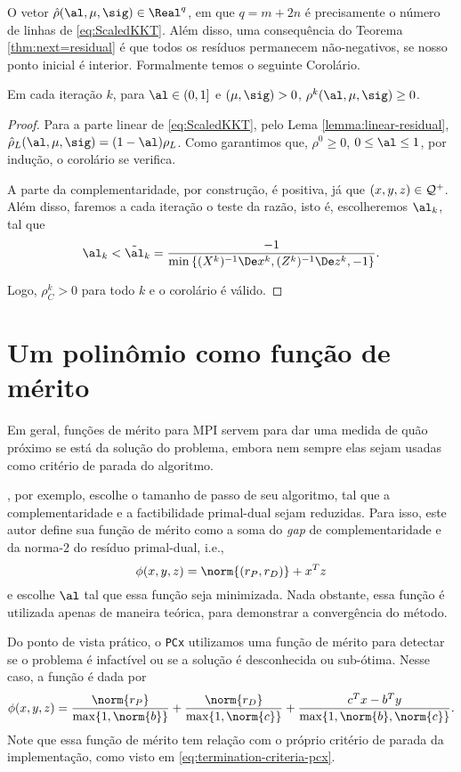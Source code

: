 O vetor  $\hat{\rho}(\al,\mu,\sig) \in \Real^q$, em que  $q = m+2n$ é
precisamente o número de linhas de  \eqref{eq:ScaledKKT}. Além disso, uma
consequência do Teorema \ref{thm:next=residual} é que todos os resíduos
permanecem não-negativos, se nosso ponto inicial é interior. Formalmente temos o seguinte Corolário. 

\begin{corol}\label{cor:positive-residual}
Em cada iteração $k$, para  $ \al \in(0,1]$ e  $(\mu, \sig)>0$,
$\rho^k(\al,\mu,\sig) \geq 0$.
\end{corol} 
\begin{proof}

Para a parte linear de  \eqref{eq:ScaledKKT}, pelo Lema
\ref{lemma:linear-residual}, $\hat{\rho}_L(\al,\mu,\sig) = (1-\al)\rho_L$. Como
garantimos que, $\rho^0\geq 0$, $0\leq\al\leq1 $, por  indução, o corolário
se verifica.

A parte da complementaridade, por construção,  é positiva, já que 
$(x,y,z)\in\mathcal{Q}^+$. Além disso, faremos a cada iteração o teste da razão, isto é, escolheremos $\alk $,
tal que 
\begin{equation}
	\label{eq:ratio-test}
\alk  < \tilde{\al}_k = \frac{-1}{\min\left\{
(X^k)^{-1}\Dex^k,(Z^k)^{-1}\Dez^k,-1 \right\}}. 
\end{equation}

Logo, $\rho^k_C>0$ para todo $k$ e o corolário é válido. 
\end{proof}

\section{Um polinômio como  função de mérito}


Em geral, funções de mérito para \ac{MPI} servem para dar uma medida de quão
próximo se está da solução do problema, embora nem sempre elas sejam usadas como
critério de parada do algoritmo. 

\textcite{Zhang:2006ic}, por exemplo, escolhe o tamanho de passo de seu
algoritmo, tal que a  complementaridade e a factibilidade primal-dual sejam
reduzidas. Para isso, este autor define sua função de mérito como a soma do
\emph{gap} de complementaridade e da norma-2 do resíduo primal-dual, i.e., \[\phi(x,y,z) =
\norm{(r_P,r_D)} + x^Tz\] e escolhe $\al$ tal que essa função seja minimizada.
Nada obstante, essa função é utilizada apenas de maneira teórica, para
demonstrar a convergência do método.

Do ponto de vista prático, o  \texttt{PCx} \cite{Czyzyk:1999hk} utilizamos 
uma função de mérito para detectar se o problema é infactível ou se a solução é desconhecida
ou sub-ótima. Nesse caso, a função é dada por 
\[
\phi(x,y,z) = \frac{\norm{r_P}}{\max \{1,\norm{b} \} } + \frac{\norm{r_D}}{\max
\{1,\norm{c} \} } + \frac{c^Tx - b^Ty}{\max \{1,\norm{b},\norm{c} \} }.
\]
Note que essa função de mérito tem relação com o próprio critério de parada
da implementação, como visto em  \eqref{eq:termination-criteria-pcx}.



